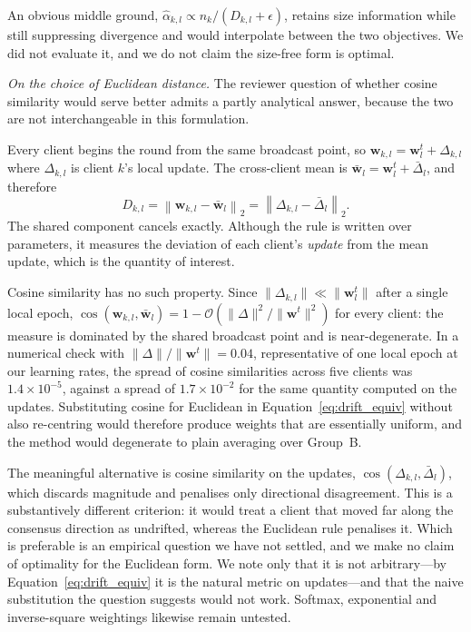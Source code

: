 \documentclass[utf8]{FrontiersinHarvard} %
\begin{document}
An obvious middle ground, $\hat{\alpha}_{k,l} \propto n_k / (D_{k,l}+\epsilon)$, retains size information while still suppressing divergence and would interpolate between the two objectives. We did not evaluate it, and we do not claim the size-free form is optimal.

\emph{On the choice of Euclidean distance.} The reviewer question of whether cosine similarity would serve better admits a partly analytical answer, because the two are not interchangeable in this formulation.

Every client begins the round from the same broadcast point, so $\mathbf{w}_{k,l} = \mathbf{w}_l^t + \Delta_{k,l}$ where $\Delta_{k,l}$ is client $k$'s local update. The cross-client mean is $\bar{\mathbf{w}}_l = \mathbf{w}_l^t + \bar{\Delta}_l$, and therefore
\begin{equation}
\label{eq:drift_equiv}
D_{k,l} = \left\|\mathbf{w}_{k,l} - \bar{\mathbf{w}}_l\right\|_2
        = \left\|\Delta_{k,l} - \bar{\Delta}_l\right\|_2 .
\end{equation}
The shared component cancels exactly. Although the rule is written over parameters, it measures the deviation of each client's \emph{update} from the mean update, which is the quantity of interest.

Cosine similarity has no such property. Since $\|\Delta_{k,l}\| \ll \|\mathbf{w}_l^t\|$ after a single local epoch, $\cos(\mathbf{w}_{k,l}, \bar{\mathbf{w}}_l) = 1 - \mathcal{O}\!\left(\|\Delta\|^2/\|\mathbf{w}^t\|^2\right)$ for every client: the measure is dominated by the shared broadcast point and is near-degenerate. In a numerical check with $\|\Delta\|/\|\mathbf{w}^t\| = 0.04$, representative of one local epoch at our learning rates, the spread of cosine similarities across five clients was $1.4\times10^{-5}$, against a spread of $1.7\times10^{-2}$ for the same quantity computed on the updates. Substituting cosine for Euclidean in Equation~\eqref{eq:drift_equiv} without also re-centring would therefore produce weights that are essentially uniform, and the method would degenerate to plain averaging over Group~B.

The meaningful alternative is cosine similarity on the updates, $\cos(\Delta_{k,l}, \bar{\Delta}_l)$, which discards magnitude and penalises only directional disagreement. This is a substantively different criterion: it would treat a client that moved far along the consensus direction as undrifted, whereas the Euclidean rule penalises it. Which is preferable is an empirical question we have not settled, and we make no claim of optimality for the Euclidean form. We note only that it is not arbitrary---by Equation~\eqref{eq:drift_equiv} it is the natural metric on updates---and that the naive substitution the question suggests would not work. Softmax, exponential and inverse-square weightings likewise remain untested.
\end{document}
